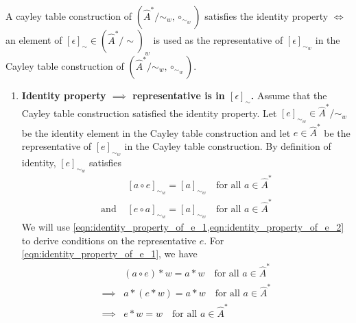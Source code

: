 \begin{propositionE}\label{prp:cayley_table_construction_satisfies_identity_iff_element_of_global_epsilon_used_as_representative}
    A cayley table construction of $(\hat{A}^{*}/\sim_{w}, \circ_{\sim_{w}})$ satisfies the identity property $\iff$ an element of $[\epsilon]_{\sim} \in (\hat{A}^{*}/\sim)_{w}$ is used as the representative of $[\epsilon]_{\sim_{w}}$ in the Cayley table construction of $(\hat{A}^{*}/\sim_{w}, \circ_{\sim_{w}})$.
\end{propositionE}
\begin{proofE}
\begin{enumerate}
    \item \textbf{Identity property $\implies$ representative is in $[\epsilon]_{\sim}$.}
    Assume that the Cayley table construction satisfied the identity property.
    Let $[e]_{\sim_{w}} \in \hat{A}^{*}/\sim_{w}$ be the identity element in the Cayley table construction and let $e \in \hat{A}^{*}$ be the representative of $[e]_{\sim_{w}}$ in the Cayley table construction.
    By definition of identity, $[e]_{\sim_{w}}$ satisfies
    \begin{align}
        & [a \circ e]_{\sim_{w}} = [a]_{\sim_{w}}  \quad \text{for all $a \in \hat{A}^{*}$} \label{eqn:identity_property_of_e_1} \\
        \text{and } & [e \circ a]_{\sim_{w}} = [a]_{\sim_{w}} \quad \text{for all $a \in \hat{A}^{*}$} \label{eqn:identity_property_of_e_2}
    \end{align}
    We will use \cref{eqn:identity_property_of_e_1,eqn:identity_property_of_e_2} to derive conditions on the representative $e$.
    For \cref{eqn:identity_property_of_e_1}, we have
    \begin{align}
        & (a \circ e) \ast w = a \ast w \quad \text{for all $a \in \hat{A}^{*}$} \\
        \implies & a \ast (e \ast w) = a \ast w \quad \text{for all $a \in \hat{A}^{*}$} \\
        \implies & e \ast w = w \quad \text{for all $a \in \hat{A}^{*}$} \label{eqn:identity_condition_e_1}
    \end{align}
    

\end{enumerate}
\end{proofE}
